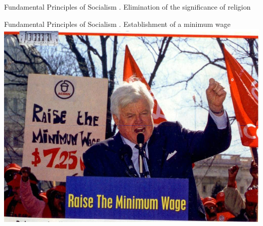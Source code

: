 \begin{frame}[t]{Fundamental Principles of Socialism}
    . Elimination of the significance of religion \\
\end{frame}

\begin{frame}[t]{Fundamental Principles of Socialism}
    . Establishment of a minimum wage \\
    \includegraphics[width=.9\textwidth]{img/wage.jpg} \\
\end{frame}

